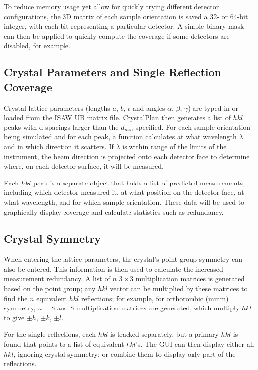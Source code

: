 \documentclass[final]{iucr}              %
\begin{document}
To reduce memory usage yet allow for quickly trying different detector
configurations, the 3D matrix of each sample orientation is saved a 32- or
64-bit integer, with each bit representing a particular detector. A simple
binary mask can then be applied to quickly compute the coverage if some
detectors are disabled, for example.          




\subsection{Crystal Parameters and Single Reflection Coverage}

Crystal lattice parameters (lengths $a$, $b$, $c$ and angles $\alpha$, $\beta$,
$\gamma$) are typed in or loaded from the ISAW UB matrix file. CrystalPlan then
generates a list of $hkl$ peaks with d-spacings larger than the $d_{min}$
specified. For each sample orientation being simulated and for each peak, a function calculates at
what wavelength $\lambda$ and in which direction it scatters. If $\lambda$ 
is within range of the limits of the instrument, the beam direction is projected
onto each detector face to determine where, on each detector surface, it will be
measured. 
 
Each $hkl$ peak is a separate object that holds a list of predicted
measurements, including which detector measured it, at what position on the
detector face, at what wavelength, and for which sample orientation. These data
will be used to  graphically display coverage and calculate statistics such as
redundancy. 



\subsection{Crystal Symmetry}

When entering the lattice parameters, the crystal's point group symmetry can
also be entered. This information is then used to calculate the increased
measurement redundancy. A list of $n$ $3\times3$ multiplication matrices is
generated based on the point group; any $hkl$ vector can be multiplied by
these matrices to find the $n$ equivalent $hkl$ reflections; for example, for
orthorombic (mmm) symmetry, $n=8$ and 8 multiplication matrices are generated, which multiply
$hkl$ to give $\pm h$, $\pm k$, $\pm l$.              

For the single reflections, each $hkl$ is tracked separately, but a primary
$hkl$ is found that points to a list of equivalent $hkl$'s. The GUI can then display
either all $hkl$, ignoring crystal symmetry; or combine them to display only part of
the reflections.             
\end{document}
